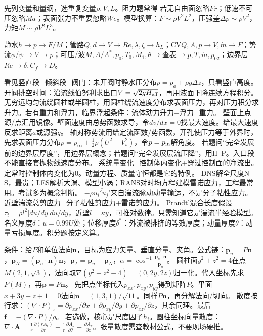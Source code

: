 先列变量和量纲，选重复变量$\rho,V,L$。阻力题常得
若无自由面忽略$Fr$；低速不可压忽略$Ma$；表面张力不重要忽略$We$。模型换算：$F\sim\rho V^2L^2$，压强差$\Delta p\sim\rho V^2$，力矩$M\sim\rho V^2L^3$。

静水$h\to p\to F/M$；管路$Q,d\to V\to Re,\lambda,\zeta\to h_L$；CV$Q,A,p\to V,\dot m\to F$；势流$\phi/\psi\to V\to p$；可压/波$M,A/A^*,p_0,T_0,M_1,\theta\to$查表$\to p,T,\dot m,p_{02}$；边界层$Re\to\delta,C_f\to D$。

看见竖直段+倾斜段+阀门：未开阀时静水压分布$p=p_a+\rho g\Delta z$，只看竖直高度。开阀排空时间：沿流线伯努利求出口$V=\sqrt{2gH_{\rm eff}}$，再用液面下降连续方程积分。
无穷远均匀流绕圆柱或半圆柱，用圆柱绕流速度分布求表面压力，再对压力积分求升力。若有重力和浮力，临界浮起条件：流体动力升力+浮力=重力。
壁面上点源/点汇用镜像。壁面速度由总势函数求导，令$dv/dx=0$找最大速度。给最大速度反求距离$a$或源强$q$。
轴对称势流用给定流函数/势函数，开孔使压力等于外界时，先求表面压力分布$p=p_\infty+\frac12\rho(U^2-V_s^2)$，令$p=p_{\rm in}$解角度。
若题问“完全发展前的边界层厚度”，用边界层概念；若题问“完全发展层流压降”，用H--P。入口段不能直接套抛物线速度分布。
系统量变化=控制体内变化+穿过控制面的净流出。定常时控制体内变化为0。动量方程、质量守恒都是它的特例。
DNS解全尺度N--S，最贵；LES解析大涡、模型小涡；RANS对时均方程建模雷诺应力，工程最常用。考试多为概念判断。
$-\rho\overline{u_i'u_j'}$来自湍流脉动动量输运，不是分子粘性应力。近壁湍流总剪应力=分子粘性剪应力+雷诺剪应力。
Prandtl混合长度假设$\tau_t=\rho l^2|du/dy|du/dy$，近壁$l=\kappa y$，可推对数律。只需知道它是湍流半经验模型。
名义厚度$\delta$：$u=0.99U$处；位移厚度$\delta^*$：外流被排挤的等效厚度；动量厚度$\theta$：动量亏损厚度。积分题按定义算。

条件：给$P$和单位法向$\bm n$，目标为应力矢量、垂直分量、夹角。公式链：$\bm p_n=P\bm n$，$\bm p_N=(\bm p_n\cdot\bm n)\bm n$，$\bm p_T=\bm p_n-\bm p_N$，$\alpha=\cos^{-1}\frac{\bm p_n\cdot\bm n}{|\bm p_n|}$。
圆柱面$y^2+z^2=4$在点$M(2,1,\sqrt3)$，法向取$\nabla(y^2+z^2-4)=(0,2y,2z)$归一化。代入坐标先求$P(M)$，再$\bm p=P\bm n$。
先把点坐标代入$p_{xx},p_{xy},p_{yy}$得到矩阵$P$。平面$x+3y+z+1=0$法向$\bm n=(1,3,1)/\sqrt{11}$。同样$P\bm n$，再分解法向/切向。
散度按行求：$(\nabla\cdot P)_x=\partial p_{xx}/\partial x+\partial p_{xy}/\partial y+\partial p_{xz}/\partial z$，其余同理。最后$\bm f=-(\nabla\cdot P)/\rho$。
若选做，核心是尺度因子$h_i$。圆柱坐标向量散度：$\nabla\cdot\bm A=\frac1r\frac{\partial(rA_r)}{\partial r}+\frac1r\frac{\partial A_\theta}{\partial\theta}+\frac{\partial A_z}{\partial z}$。张量散度需查教材公式，不要现场硬推。

